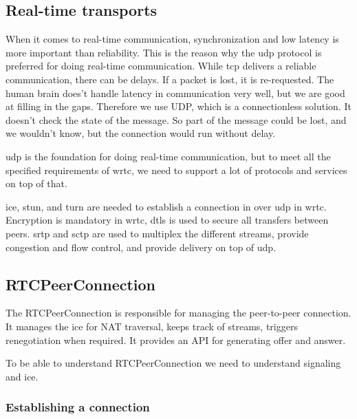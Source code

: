 \subsection{Real-time transports}
When it comes to real-time communication, synchronization and low latency is more important than reliability. This is the reason why the \gls{udp} protocol is preferred for doing real-time communication. While \gls{tcp} delivers a reliable communication, there can be delays. If a packet is lost, it is re-requested. The human brain does't handle latency in communication very well, but we are good at filling in the gaps. Therefore we use UDP, which is a connectionless solution. It doesn't check the state of the message. So part of the message could be lost, and we wouldn't know, but the connection would run without delay.

\gls{udp} is the foundation for doing real-time communication, but to meet all the specified requirements of \gls{wrtc}, we need to support a lot of protocols and services on top of that.

\gls{ice}, \gls{stun}, and \gls{turn} are needed to establish a connection in over \gls{udp} in \gls{wrtc}. Encryption is mandatory in \gls{wrtc}, \gls{dtls} is used to secure all transfers between peers. \gls{srtp} and \gls{sctp} are used to multiplex the different streams, provide congestion and flow control, and provide delivery on top of \gls{udp}.

\subsection{RTCPeerConnection}
The RTCPeerConnection is responsible for managing the peer-to-peer connection. It manages the \gls{ice} for NAT traversal, keeps track of streams, triggers renegotiation when required. It provides an API for generating offer and answer.

To be able to understand RTCPeerConnection we need to understand signaling and \gls{ice}.

\subsubsection{Establishing a connection}

